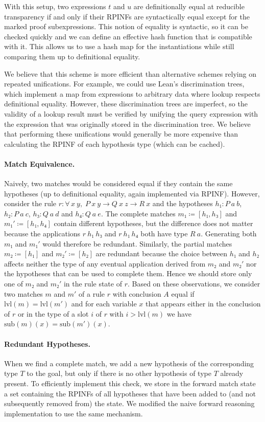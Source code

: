 \documentclass[runningheads,leqno]{llncs}
\newcommand{\para}[1]{\paragraph{\bfseries\upshape #1}}
\newcommand{\All}[2]{\ensuremath{\forall\, #1,\; #2}}
\newcommand{\sub}{\ensuremath{\mathrm{sub}}}
\newcommand{\lvl}{\ensuremath{\mathrm{lvl}}}
\begin{document}
With this setup, two expressions $t$ and $u$ are definitionally equal at reducible transparency if and only if their RPINFs are syntactically equal except for the marked proof subexpressions.
This notion of equality is syntactic, so it can be checked quickly and we can define an effective hash function that is compatible with it.
This allows us to use a hash map for the instantiations while still comparing them up to definitional equality.

We believe that this scheme is more efficient than alternative schemes relying on repeated unifications.
For example, we could use Lean's discrimination trees, which implement a map from expressions to arbitrary data where lookup respects definitional equality.
However, these discrimination trees are imperfect, so the validity of a lookup result must be verified by unifying the query expression with the expression that was originally stored in the discrimination tree.
We believe that performing these unifications would generally be more expensive than calculating the RPINF of each hypothesis type (which can be cached).

\para{Match Equivalence.}
Naively, two matches would be considered equal if they contain the same hypotheses (up to definitional equality, again implemented via RPINF).
However, consider the rule $r : \All{x~y}{P~x~y → Q~x~z → R~x}$ and the hypotheses $h₁ : P~a~b$, $h₂ : P~a~c$, $h₃ : Q~a~d$ and $h₄ : Q~a~e$.
The complete matches $m₁ ≔ [h₁, h₃]$ and $m₁' ≔ [h₁, h₄]$ contain different hypotheses, but the difference does not matter because the applications $r~h₁~h₃$ and $r~h₁~h₄$ both have type $R~a$.
Generating both $m₁$ and $m₁'$ would therefore be redundant.
Similarly, the partial matches $m₂ ≔ [h₁]$ and $m₂' ≔ [h₂]$ are redundant because the choice between $h₁$ and $h₂$ affects neither the type of any eventual application derived from $m₂$ and $m₂'$ nor the hypotheses that can be used to complete them.
Hence we should store only one of $m₂$ and $m₂'$ in the rule state of $r$.
Based on these observations, we consider two matches $m$ and $m'$ of a rule $r$ with conclusion $A$ equal if $\lvl(m) = \lvl(m')$ and for each variable $x$ that appears either in the conclusion of $r$ or in the type of a slot $i$ of $r$ with $i > \lvl(m)$ we have $\sub(m)(x) = \sub(m')(x)$.

\para{Redundant Hypotheses.}
When we find a complete match, we add a new hypothesis of the corresponding type $T$ to the goal, but only if there is no other hypothesis of type $T$ already present.
To efficiently implement this check, we store in the forward match state a set containing the RPINFs of all hypotheses that have been added to (and not subsequently removed from) the state.
We modified the naive forward reasoning implementation to use the same mechanism.
\end{document}

